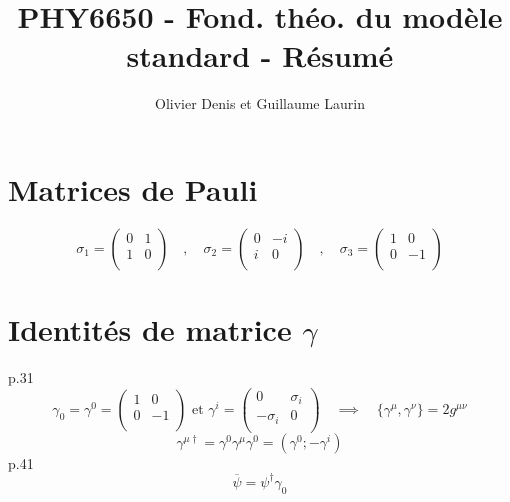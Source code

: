 \documentclass[12pt]{article}
\begin{document}
\title{PHY6650 - Fond. théo. du modèle standard - Résumé}
\author{Olivier Denis et Guillaume Laurin}
\maketitle
\newpage

\section{Matrices de Pauli}
\begin{equation}
    \sigma_1 = \begin{pmatrix} 0 & 1\\ 1 & 0\\ \end{pmatrix} \quad , \quad \sigma_2 = \begin{pmatrix} 0  & -i \\ i & 0\\ \end{pmatrix} \quad , \quad \sigma_3 = \begin{pmatrix} 1 & 0 \\ 0 & -1 \\ \end{pmatrix}
\end{equation}

\section{Identités de matrice $\gamma$}
p.31\\
\begin{equation}
  \gamma_0 = \gamma^0 = \begin{pmatrix}
    1 & 0 \\
    0 & -1\\
\end{pmatrix} \text{  et   } \gamma^i = \begin{pmatrix}
  0 & \sigma_i \\
  -\sigma_i & 0\\
\end{pmatrix} \quad \implies \quad \{\gamma^\mu, \gamma^\nu\} = 2 g^{\mu\nu}
\end{equation}
\begin{equation}
  \gamma^{\mu\dag} = \gamma^0 \gamma^\mu \gamma^0 = ( \gamma^0; -\gamma^i )
\end{equation}
p.41 \\
\begin{equation}
  \overline{\psi} = \psi^\dag\gamma_0
\end{equation}
\end{document}
